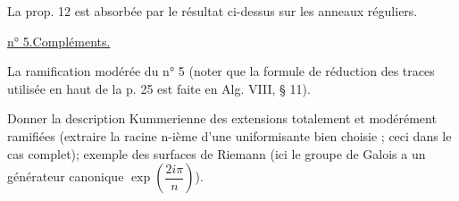 La prop. 12 est absorbée par le résultat ci-dessus sur les anneaux réguliers.

\uline{n° 5.}\quad \uline{Compléments.}

La ramification modérée du n° 5 (noter que la formule de réduction des traces utilisée en haut de la p. 25 est faite en Alg. VIII, § 11).

Donner la description Kummerienne des extensions totalement et modérément ramifiées (extraire la racine n-ième d'une uniformisante bien choisie ; ceci dans le cas complet); exemple des surfaces de Riemann (ici le groupe de Galois a un générateur canonique $\exp\left(\dfrac{2i\pi}{n}\right)$).

